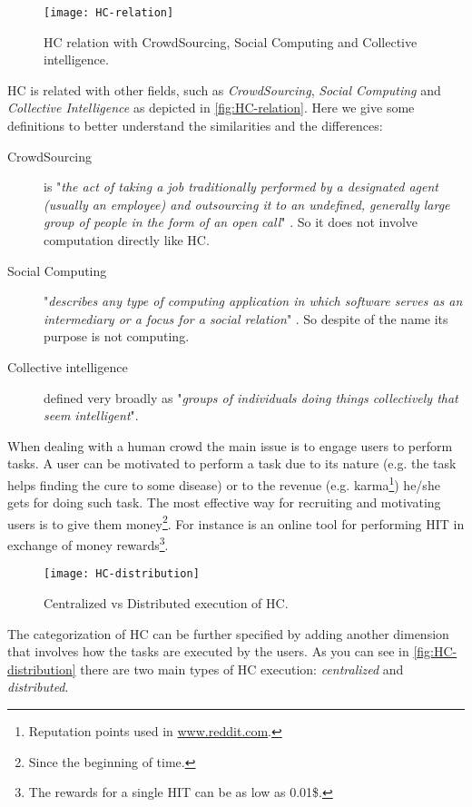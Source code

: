 \begin{figure}[htb]
    \centering
    \texttt{[image: HC-relation]}
    \caption{\acl{HC} relation with CrowdSourcing, Social Computing and Collective
    intelligence.}
    \label{fig:HC-relation}
\end{figure}
\acl{HC} is related with other fields, such as \emph{CrowdSourcing},
\emph{Social Computing} and \emph{Collective Intelligence} as depicted in
\autoref{fig:HC-relation}. Here we give some definitions to better understand the
similarities and the differences:
\begin{description}
    \item[CrowdSourcing] is "\emph{the act of taking a job traditionally
    performed by a designated agent (usually an employee) and outsourcing it to an
    undefined, generally large group of people in the form of an open call}"
    \cite{howe2006rise}. So it does not involve computation directly like \ac{HC}.

    \item[Social Computing] "\emph{describes any type of computing application
    in which software serves as an intermediary or a focus for a social relation}"
    \cite{schuler1994social}. So despite of the name its purpose is not computing.

    \item[Collective intelligence] defined very broadly as "\emph{groups of
    individuals doing things collectively that seem intelligent}".
\end{description}

When dealing with a human crowd the main issue is to engage users to perform tasks.
A user can be motivated to perform a task due to its nature
(e.g. the task helps finding the cure to some disease) or to the revenue (e.g.
karma\footnote{Reputation points used in \url{www.reddit.com}.}) he/she gets for doing
such task. The most effective way for recruiting and motivating users is to give
them money\footnote{Since the beginning of time.}. For instance
 is an online tool for performing \ac{HIT} in exchange of money
rewards\footnote{The rewards for a single \ac{HIT} can be as low as 0.01\$.}.\\

\begin{figure}[htb]
    \centering
    \texttt{[image: HC-distribution]}
    \caption{Centralized vs Distributed execution of \acl{HC}.}
    \label{fig:HC-distribution}
\end{figure}
The categorization of \ac{HC} can be further specified by adding another dimension
that involves how the tasks are executed by the users. As you can see in
\autoref{fig:HC-distribution} there are two main types of \ac{HC} execution:
\emph{centralized} and \emph{distributed}.






